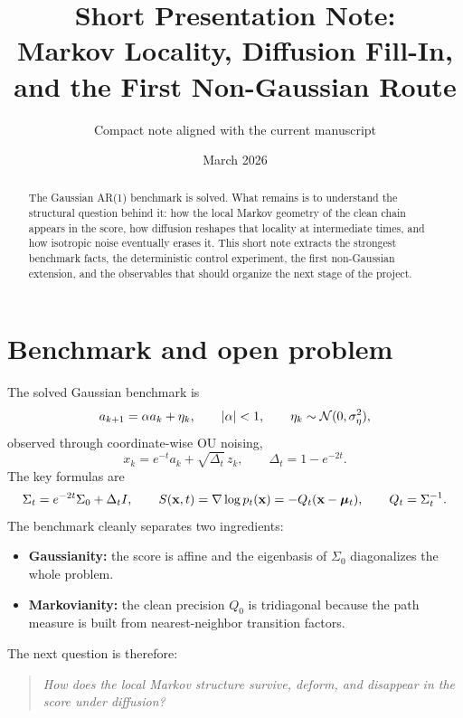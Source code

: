 \documentclass[10pt]{article}
\title{\textbf{Short Presentation Note:}\\
Markov Locality, Diffusion Fill-In, and the First Non-Gaussian Route}
\author{Compact note aligned with the current manuscript}
\date{March 2026}
\begin{document}
\maketitle
\thispagestyle{empty}

\begin{abstract}
The Gaussian AR(1) benchmark is solved. What remains is to understand the structural question behind it: how the local Markov geometry of the clean chain appears in the score, how diffusion reshapes that locality at intermediate times, and how isotropic noise eventually erases it. This short note extracts the strongest benchmark facts, the deterministic control experiment, the first non-Gaussian extension, and the observables that should organize the next stage of the project.
\end{abstract}

\section{Benchmark and open problem}

The solved Gaussian benchmark is
\begin{equation}
 a_{k+1}=\alpha a_k+\eta_k,
 \qquad |\alpha|<1,
 \qquad \eta_k\sim\mathcal{N}(0,\sigma_\eta^2),
\end{equation}
observed through coordinate-wise OU noising,
\begin{equation}
 x_k=e^{-t}a_k+\sqrt{\Delta_t}\,z_k,
 \qquad \Delta_t=1-e^{-2t}.
\end{equation}
The key formulas are
\begin{equation}
 \Sigma_t=e^{-2t}\Sigma_0+\Delta_tI,
 \qquad
 S(\mathbf x,t)=\nabla\log p_t(\mathbf x)=-Q_t(\mathbf x-\boldsymbol\mu_t),
 \qquad Q_t=\Sigma_t^{-1}.
\end{equation}
The benchmark cleanly separates two ingredients:
\begin{itemize}[leftmargin=1.1cm]
\item \textbf{Gaussianity:} the score is affine and the eigenbasis of $\Sigma_0$ diagonalizes the whole problem.
\item \textbf{Markovianity:} the clean precision $Q_0$ is tridiagonal because the path measure is built from nearest-neighbor transition factors.
\end{itemize}
The next question is therefore:
\begin{quote}
\emph{How does the local Markov structure survive, deform, and disappear in the score under diffusion?}
\end{quote}
\end{document}
